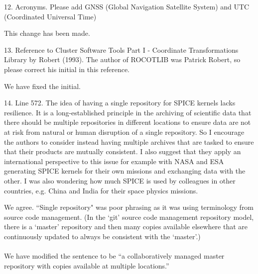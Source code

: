 \documentclass[11pt]{article}
\begin{document}
12. Acronyms. Please add GNSS (Global Navigation Satellite System) and UTC (Coordinated Universal Time)
\\
{\color{violet}
\begin{leftbar}
This change has been made.
\end{leftbar}
}

13. Reference to Cluster Software Tools Part I - Coordinate Transformations Library by Robert (1993). The author of ROCOTLIB was Patrick Robert, so please correct his initial in this reference.
\\
{\color{violet}
\begin{leftbar}
We have fixed the initial.
\end{leftbar}
}

14. Line 572. The idea of having a single repository for SPICE kernels lacks resilience. It is a long-established principle in the archiving of scientific data that there should be multiple repositories in different locations to ensure data are not at risk from natural or human disruption of a single repository. So I encourage the authors to consider instead having multiple archives that are tasked to ensure that their products are mutually consistent. I also suggest that they apply an international perspective to this issue for example with NASA and ESA generating SPICE kernels for their own missions and exchanging data with the other. I was also wondering how much SPICE is used by colleagues in other countries, e.g. China and India for their space physics missions.
\\
{\color{violet}
\begin{leftbar}
We agree. ``Single repository" was poor phrasing as it was using terminology from source code management. (In the `git' source code management repository model, there is a `master' repository and then many copies available elsewhere that are continuously updated to always be consistent with the `master'.)
\\
\\
We have modified the sentence to be ``a collaboratively managed master repository with copies available at multiple locations.''
\end{leftbar}
}
\end{document}
